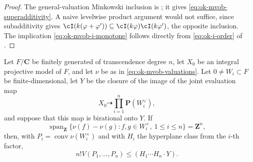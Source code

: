 \begin{proof}
The general-valuation Minkowski inclusion is
\cite[Proposition~10.3.10]{XiaBook}; it gives
\eqref{eq:ok-mvob-superadditivity}.  A naive levelwise product argument
would not suffice, since subadditivity gives
$\cI(k(\varphi+\varphi'))
 \subseteq\cI(k\varphi)\cI(k\varphi')$, the opposite inclusion.
The implication \eqref{eq:ok-mvob-i-monotone} follows directly from
\eqref{eq:ok-i-order} of .
\end{proof}

\begin{lemma}\label{lem:ok-mvob-finite-level}
Let $F/\mathbf C$ be finitely generated of transcendence degree $n$,
let $X_0$ be an integral projective model of $F$, and let $\nu$ be as
in \eqref{eq:ok-mvob-valuations}.  Let
$0\ne W_i\subset F$ be finite-dimensional, let $Y$ be the closure of
the image of the joint evaluation map
\[
 X_0\dashrightarrow\prod_{i=1}^n\mathbf P(W_i^\vee),
\]
and suppose that this map is birational onto $Y$.  If
\[
 \operatorname{span}_{\mathbf Z}
 \{\nu(f)-\nu(g):f,g\in W_i^\times,\ 1\leq i\leq n\}
 =\mathbf Z^n,
\tag{55.31}\label{eq:ok-mvob-finite-level-degree}
\]
then, with $P_i=\operatorname{conv}\nu(W_i^\times)$ and with $H_i$
the hyperplane class from the $i$-th factor,
\[
 n!V(P_1,\ldots,P_n)\leq(H_1\cdots H_n\cdot Y).
\tag{55.32}\label{eq:ok-mvob-admissible}
\]
\end{lemma}

